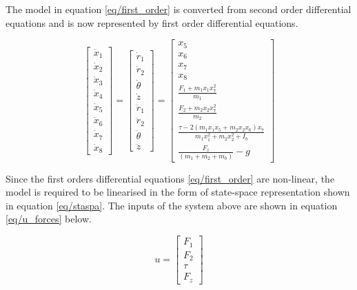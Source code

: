\documentclass{UoNMCHA}
\numberwithin{equation}{section}
\begin{document}
	\newpage
The model in equation \eqref{eq/first_order} is converted from second order differential equations and is now represented by first order differential equations.

	\begin{equation}\label{eq/first_order}
\left[\begin{array}{c}
	\dot{x}_{1} \\
	\dot{x}_{2} \\
	\dot{x}_{3} \\
	\dot{x}_{4} \\
	\dot{x}_{5} \\
	\dot{x}_{6} \\
	\dot{x}_{7} \\
	\dot{x}_{8}
\end{array}\right]=\left[\begin{array}{c}
	\dot{r}_{1} \\
	\dot{r}_{2} \\
	\dot{\theta} \\
	\dot{z} \\
	\ddot{r}_{1} \\
	\ddot{r}_{2} \\
	\ddot{\theta} \\
	\ddot{z}
\end{array}\right]=\left[\begin{array}{c}
x_{5} \\
x_{6} \\
x_{7} \\
x_{8} \\
\frac{F_{1}+m_{1} x_{1} x_{7}^{2}}{m_{1}} \\
\frac{F_{2}+m_{2} x_{2} x_{7}^{2}}{m_{2}} \\
\frac{\tau-2\left(m_{1} x_{1} x_{5}+m_{2} x_{2} x_{6}\right) x_{7}}{m_{1} x_{1}^{2}+m_{2} x_{2}^{2}+I_{b}} \\
\frac{F_{z}}{\left(m_{1}+m_{2}+m_{b}\right)}-g
\end{array}\right]
\end{equation}

Since the first orders differential equations \eqref{eq/first_order} are non-linear, the model is required to be linearised in the form of state-space representation shown in equation \eqref{eq/staspa}. The inputs of the system above are shown in equation \eqref{eq/u_forces} below.

	\begin{equation}\label{eq/u_forces}
	u=\left[\begin{array}{c}
		F_{1} \\
		F_{2} \\
		\tau \\
		F_{z}
	\end{array}\right]
	\end{equation}
\end{document}
